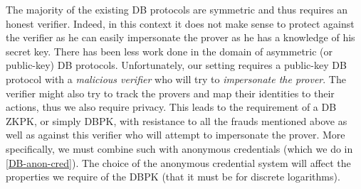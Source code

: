 The majority of the existing \ac{DB} protocols are symmetric and thus requires an honest verifier.
Indeed, in this context it does not make sense to protect against the verifier as he can easily impersonate the prover as he has a knowledge of his secret key.
There has been less work done in the domain of asymmetric (or public-key) \ac{DB} protocols.
Unfortunately, our setting requires a public-key \ac{DB} protocol with a \emph{malicious verifier} who will try to \emph{impersonate the prover}.
The verifier might also try to track the provers and map their identities to their actions, thus we also require privacy.
This leads to the requirement of a \ac{DB} \ac{ZKPK}, or simply \ac{DBPK}, with resistance to all the frauds mentioned above as well as against this verifier who will attempt to impersonate the prover.
More specifically, we must combine such  with anonymous credentials (which we do in \cref{DB-anon-cred}).
The choice of the anonymous credential system will affect the properties we require of the \ac{DBPK} (\eg that it must be  for discrete logarithms).